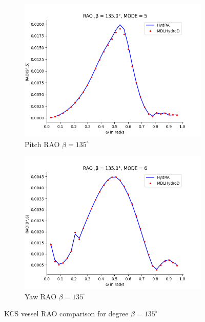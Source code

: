 \begin{figure}[H]
\begin{subfigure}[b]{0.45\textwidth}
        \includegraphics[width=\textwidth]{plots/kcs/rao2/rao5.png}
        \caption{Pitch RAO $\beta = 135^{\circ}$}
    \end{subfigure}
    \begin{subfigure}[b]{0.45\textwidth}
        \includegraphics[width=\textwidth]{plots/kcs/rao2/rao6.png}
        \caption{Yaw RAO $\beta = 135^{\circ}$}
    \end{subfigure}
    \caption{KCS vessel RAO comparison for degree $\beta= 135^{\circ}$}
    \label{fig:kcs_rao_135}
\end{figure}


\newpage

